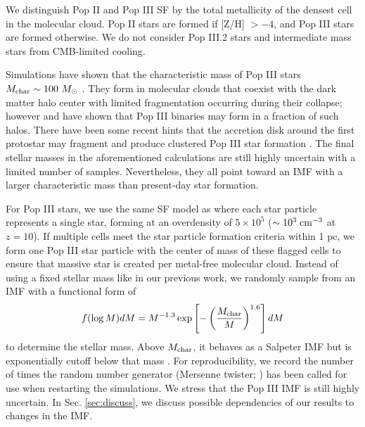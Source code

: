 \documentclass[apjl]{emulateapj}
\begin{document}
We distinguish Pop II and Pop III SF by the total metallicity of the
densest cell in the molecular cloud.  Pop II stars are formed if [Z/H]
$> -4$, and Pop III stars are formed otherwise.  We do not consider
Pop III.2 stars and intermediate mass stars from CMB-limited cooling.

Simulations have shown that the characteristic mass of Pop III stars
$M_{\rm char} \sim 100~\Ms$ \citep{ABN02, Bromm02_P3, OShea07a,
  Yoshida08}.  They form in molecular clouds that coexist with the
dark matter halo center with limited fragmentation occurring during
their collapse; however \citet{2009Sci...325..601T} and
\citet{Stacy10_Binary} have shown that Pop III binaries may form in a
fraction of such halos.  There have been some recent hints that the
accretion disk around the first protostar may fragment and produce
clustered Pop III star formation \citep{Clark11_Frag,
  Greif11_P3Cluster}.  The final stellar masses in the aforementioned
calculations are still highly uncertain with a limited number of
samples.  Nevertheless, they all point toward an IMF with a larger
characteristic mass than present-day star formation.


For Pop III stars, we use the same SF model as \citet{Wise08_Gal}
where each star particle represents a single star, forming at an
overdensity of $5 \times 10^5$ ($\sim 10^3\; \cubecm$ at $z=10$).  If
multiple cells meet the star particle formation criteria within 1 pc,
we form one Pop III star particle with the center of mass of these
flagged cells to ensure that massive star is created per metal-free
molecular cloud.  Instead of using a fixed stellar mass like in our
previous work, we randomly sample from an IMF with a functional form
of
%
\begin{equation}
\label{eqn:imf}
f(\log M) dM = M^{-1.3} \exp\left[-\left(\frac{M_{\rm
      char}}{M}\right)^{1.6}\right] dM
\end{equation}
to determine the stellar mass.  Above $M_{\rm char}$, it behaves as a
Salpeter IMF but is exponentially cutoff below that mass
\citep{Chabrier03, Clark09}.  For reproducibility, we record the
number of times the random number generator (Mersenne twister;
\citet{MTwister}) has been called for use when restarting the
simulations.  We stress that the Pop III IMF is still highly
uncertain.  In Sec. \ref{sec:discuss}, we discuss possible
dependencies of our results to changes in the IMF.
\end{document}
